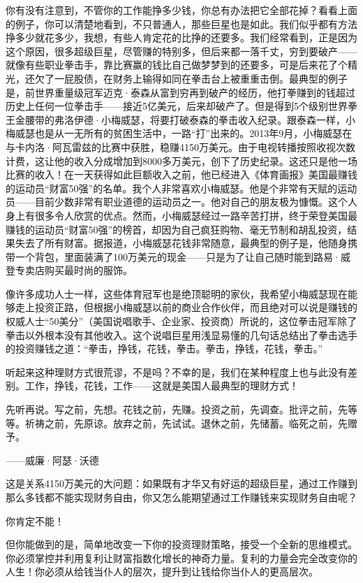 你有没有注意到，不管你的工作能挣多少钱，你总有办法把它全部花掉？看看上面的例子，你可以清楚地看到，不只普通人，那些巨星也是如此。我们似乎都有方法挣多少就花多少，我想，有些人肯定花的比挣的还要多。我们经常看到，正是因为这个原因，很多超级巨星，尽管赚的特别多，但后来都一落千丈，穷到要破产——就像有些职业拳击手，靠比赛赢的钱比自己做梦梦到的还要多，可是后来花了个精光，还欠了一屁股债，在财务上输得如同在拳击台上被重重击倒。最典型的例子是，前世界重量级冠军迈克·泰森从富到穷再到破产的经历，他打拳赚到的钱超过历史上任何一位拳击手——接近5亿美元，后来却破产了。但是得到5个级别世界拳王金腰带的弗洛伊德·小梅威瑟，将要打破泰森的拳击收入纪录。跟泰森一样，小梅威瑟也是从一无所有的贫困生活中，一路“打”出来的。2013年9月，小梅威瑟在与卡内洛·阿瓦雷兹的比赛中获胜，稳赚4150万美元。由于电视转播按照收视次数计费，这让他的收入分成增加到8000多万美元，创下了历史纪录。这还只是他一场比赛的收入！在一天获得如此巨额收入之前，他已经进入《体育画报》美国最赚钱的运动员“财富50强”的名单。我个人非常喜欢小梅威瑟。他是个非常有天赋的运动员——目前少数非常有职业道德的运动员之一。他对自己的朋友极为慷慨。这个人身上有很多令人欣赏的优点。然而，小梅威瑟经过一路辛苦打拼，终于荣登美国最赚钱的运动员“财富50强”的榜首，却因为自己疯狂购物、毫无节制和胡乱投资，结果失去了所有财富。据报道，小梅威瑟花钱非常随意，最典型的例子是，他随身携带一个背包，里面装满了100万美元的现金——只是为了让自己随时能到路易·威登专卖店购买最时尚的服饰。

像许多成功人士一样，这些体育冠军也是绝顶聪明的家伙，我希望小梅威瑟现在能够走上投资正路，但根据小梅威瑟以前的商业合作伙伴，而且绝对可以说是赚钱的权威人士“50美分”（美国说唱歌手、企业家、投资商）所说的，这位拳击冠军除了拳击以外根本没有其他收入。这个说唱巨星用浅显易懂的几句话总结出了拳击选手的投资赚钱之道：“拳击，挣钱，花钱，拳击。拳击，挣钱，花钱，拳击。”

听起来这种理财方式很荒谬，不是吗？不幸的是，我们在某种程度上也与此没有差别。工作，挣钱，花钱，工作——这就是美国人最典型的理财方式！

\begin{BookQuote}
先听再说。写之前，先想。花钱之前，先赚。投资之前，先调查。批评之前，先等等。祈祷之前，先原谅。放弃之前，先试试。退休之前，先储蓄。临死之前，先赠予。

\hfill ——威廉·阿瑟·沃德
\end{BookQuote}

这是关系4150万美元的大问题：如果既有才华又有好运的超级巨星，通过工作赚到那么多钱都不能实现财务自由，你又怎么能期望通过工作赚钱来实现财务自由呢？

你肯定不能！

但你能做到的是，简单地改变一下你的投资理财策略，接受一个全新的思维模式。你必须掌控并利用复利让财富指数化增长的神奇力量。复利的力量会完全改变你的人生！你必须从给钱当仆人的层次，提升到让钱给你当仆人的更高层次。

